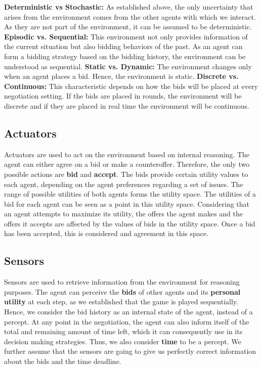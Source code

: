 \documentclass[a4paper,11pt]{article}
\theoremstyle{mytheor}
\begin{document}
\textbf{Deterministic vs Stochastic:}
As established above, the only uncertainty that arises from the environment comes from the other agents with which we interact. As they are not part of the environment, it can be assumed to be deterministic. 
\textbf{Episodic vs. Sequential:} This environment not only provides information of the current situation but also bidding behaviors of the past. As an agent can form a bidding strategy based on the bidding history, the environment can be understood as sequential. 
\textbf{Static vs. Dynamic:} The environment changes only when an agent places a bid. Hence, the environment is static.
\textbf{Discrete vs. Continuous:} This characteristic depends on how the bids will be placed at every negotiation setting. If the bids are placed in rounds, the environment will be discrete and if they are placed in real time the environment will be continuous.

\subsection{Actuators}
Actuators are used to act on the environment based on internal reasoning. The agent can either agree on a bid or make a counteroffer. Therefore, the only two possible actions are \textbf{bid} and \textbf{accept}. The bids provide certain utility values to each agent, depending on the agent preferences regarding a set of issues. The range of possible utilities of both agents forms the utility space. The utilities of a bid for each agent can be seen as a point in this utility space. Considering that an agent attempts to maximize its utility, the offers the agent makes and the offers it accepts are affected by the values of bids in the utility space. Once a bid has been accepted, this is considered and agreement in this space.

\subsection{Sensors}
Sensors are used to retrieve information from the environment for reasoning purposes. The agent can perceive the \textbf{bids} of other agents and its \textbf{personal utility} at each step, as we established that the game is played sequentially. Hence, we consider the bid history as an internal state of the agent, instead of a percept. At any point in the negotiation, the agent can also inform itself of the total and remaining amount of time left, which it can consequently use in its decision making strategies. Thus, we also consider \textbf{time} to be a percept. We further assume that the sensors are going to give us perfectly correct information about the bids and the time deadline.
\end{document}
